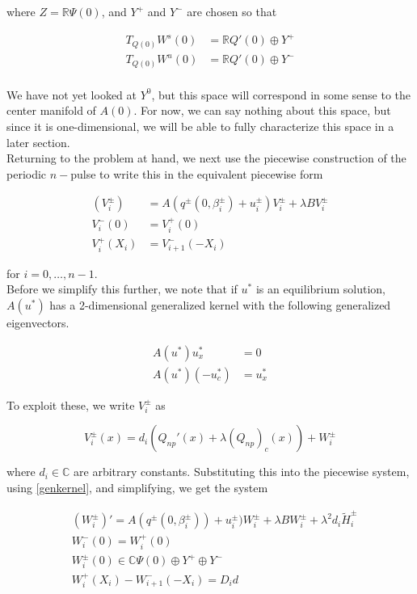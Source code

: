\documentclass[12pt]{article}
\def\R{{\mathbb R}}
\def\C{{\mathbb C}}
\begin{document}
where $Z = \R \Psi(0)$, and $Y^+$ and $Y^-$ are chosen so that

\begin{align*}
T_{Q(0)} W^s(0) &= \R Q'(0) \oplus Y^+ \\
T_{Q(0)} W^u(0) &= \R Q'(0) \oplus Y^- \\
\end{align*}

We have not yet looked at $Y^0$, but this space will correspond in some sense to the center manifold of $A(0)$. For now, we can say nothing about this space, but since it is one-dimensional, we will be able to fully characterize this space in a later section.\\

Returning to the problem at hand, we next use the piecewise construction of the periodic $n-$pulse to write this in the equivalent piecewise form

\begin{align*}
(V_i^\pm) &= A( q^\pm(0, \beta_i^\pm) + u_i^\pm) V_i^\pm + \lambda B V_i^\pm \\
V_i^-(0) &= V_i^+(0) \\
V_i^+(X_i) &= V_{i+1}^-(-X_i) 
\end{align*}

for $i = 0, \dots, n-1$. \\

Before we simplify this further, we note that if $u^*$ is an equilibrium solution, $A(u^*)$ has a 2-dimensional generalized kernel with the following generalized eigenvectors.

\begin{align}\label{genkernel}
A(u^*)u^*_x &= 0 \nonumber \\
A(u^*)(-u^*_c) &= u^*_x
\end{align}

To exploit these, we write $V_i^\pm$ as 

\begin{equation}
V_i^\pm(x) = d_i (Q_{np}'(x) + \lambda (Q_{np})_c(x)) + W_i^\pm 
\end{equation}

where $d_i \in \C$ are arbitrary constants. Substituting this into the piecewise system, using \eqref{genkernel}, and simplifying, we get the system

\begin{align*}
&(W_i^\pm)' = A( q^\pm(0, \beta_i^\pm) ) + u_i^\pm) W_i^\pm + \lambda B W_i^\pm + \lambda^2 d_i \tilde{H}_i^\pm \\
&W_i^-(0) = W_i^+(0) \\
&W_i^\pm(0) \in \C \Psi(0) \oplus Y^+ \oplus Y^- \\
&W_i^+(X_i) - W_{i+1}^-(-X_i) = D_i d
\end{align*}
\end{document}
